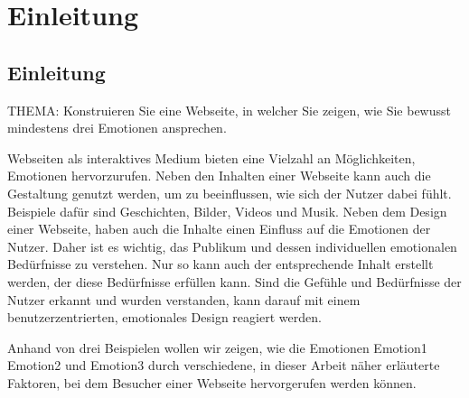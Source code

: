 \documentclass[./dokumentation.tex]{subfiles}
\begin{document}
\chapter{Einleitung}
\section{Einleitung}


THEMA: Konstruieren Sie eine Webseite, in welcher Sie zeigen, wie Sie bewusst mindestens drei Emotionen ansprechen. 

Webseiten als interaktives Medium bieten eine Vielzahl an Möglichkeiten, Emotionen hervorzurufen. Neben den Inhalten einer Webseite kann auch die Gestaltung genutzt werden, um zu beeinflussen, wie sich der Nutzer dabei fühlt. Beispiele dafür sind Geschichten, Bilder, Videos und Musik.
Neben dem Design einer Webseite, haben auch die Inhalte einen Einfluss auf die Emotionen der Nutzer. Daher ist es wichtig, das Publikum und dessen individuellen emotionalen Bedürfnisse zu verstehen. Nur so kann auch der entsprechende Inhalt erstellt werden, der diese Bedürfnisse erfüllen kann. Sind die Gefühle und Bedürfnisse der Nutzer erkannt und wurden verstanden, kann darauf mit einem benutzerzentrierten, emotionales Design reagiert werden.

Anhand von drei Beispielen wollen wir zeigen, wie die Emotionen Emotion1 Emotion2 und Emotion3 durch verschiedene, in dieser Arbeit näher erläuterte Faktoren, bei dem Besucher einer Webseite hervorgerufen werden können.
\end{document}
